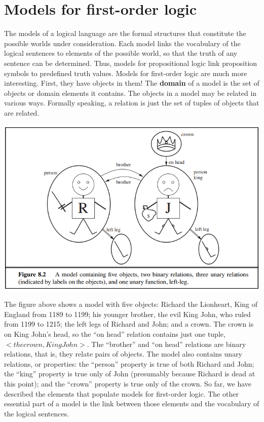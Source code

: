 \section{Models for first-order logic}
The models of a logical language are the formal structures that
constitute the possible worlds under consideration. Each model links the vocabulary of the logical sentences to elements of the possible world, so that the truth of any sentence can be determined. Thus, models for propositional logic link proposition symbols to predefined truth values. Models for first-order logic are much more interesting. First, they have objects in them! The \textbf{domain} of a model is the set of objects or domain elements it contains. The objects in a model may be related in various ways. Formally speaking, a relation is just the set of tuples of objects that are related.
\begin{center}
    \includegraphics[]{images/FOL model.png}
\end{center}
The figure above shows a model with five objects: Richard the Lionheart, King of England from 1189 to 1199; his younger brother, the evil King John, who ruled from 1199 to 1215; the left legs of Richard and John; and a crown. The crown is on King John’s head, so the “on head” relation contains just one tuple, $<the crown, King John>$. The “brother” and “on head” relations are binary relations, that is, they relate pairs of objects. The model also contains unary relations, or properties: the “person” property is true of both Richard and John; the “king” property is true only of John (presumably because Richard is dead at this point); and the “crown” property is true only of the crown. So far, we have described the elements that populate models for first-order logic. The other essential part of a model is the link between those elements and the vocabulary of the logical sentences.
